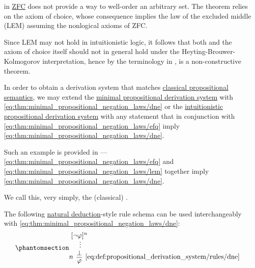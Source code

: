 \begin{example}\label{ex:def:brouwer_heyting_kolmogorov_interpretation/well_ordering_principle_zfc}
   in \hyperref[def:set]{ZFC} does not provide a way to well-order an arbitrary set. The theorem relies on the axiom of choice, whose consequence  implies the law of the excluded middle (LEM) assuming the nonlogical axioms of ZFC.

  Since LEM may not hold in intuitionistic logic, it follows that both  and the axiom of choice itself should not in general hold under the Heyting-Brouwer-Kolmogorov interpretation, hence by the terminology in ,  is a non-constructive theorem.
\end{example}

\begin{definition}\label{def:propositional_derivation_system}
  In order to obtain a derivation system that matches \hyperref[def:propositional_semantics]{classical propositional semantics}, we may extend the \hyperref[def:minimal_propositional_derivation_system]{minimal propositional derivation system} with \eqref{eq:thm:minimal_propositional_negation_laws/dne} or the \hyperref[def:intuitionistic_propositional_derivation_system]{intuitionistic propositional derivation system} with any statement that in conjunction with \eqref{eq:thm:minimal_propositional_negation_laws/efq} imply \eqref{eq:thm:minimal_propositional_negation_laws/dne}.

  Such an example is provided in  --- \eqref{eq:thm:minimal_propositional_negation_laws/efq} and \eqref{eq:thm:minimal_propositional_negation_laws/lem} together imply \eqref{eq:thm:minimal_propositional_negation_laws/dne}.

  We call this, very simply, the (classical) .

   The following \hyperref[thm:minimal_natural_deduction]{natural deduction}-style rule schema can be used interchangeably with \eqref{eq:thm:minimal_propositional_negation_laws/dne}:
  \begin{equation*}\taglabel[\textrm{R} \textrm{DNE}]{eq:def:propositional_derivation_system/rules/dne}
    \begin{prooftree}
      \hypo{ [\neg \varphi]^n }
      \ellipsis {} { \bot }
      \infer[left label=\( n \)]1[\ref{eq:def:propositional_derivation_system/rules/dne}]{ \varphi }
    \end{prooftree}
  \end{equation*}
\end{definition}

